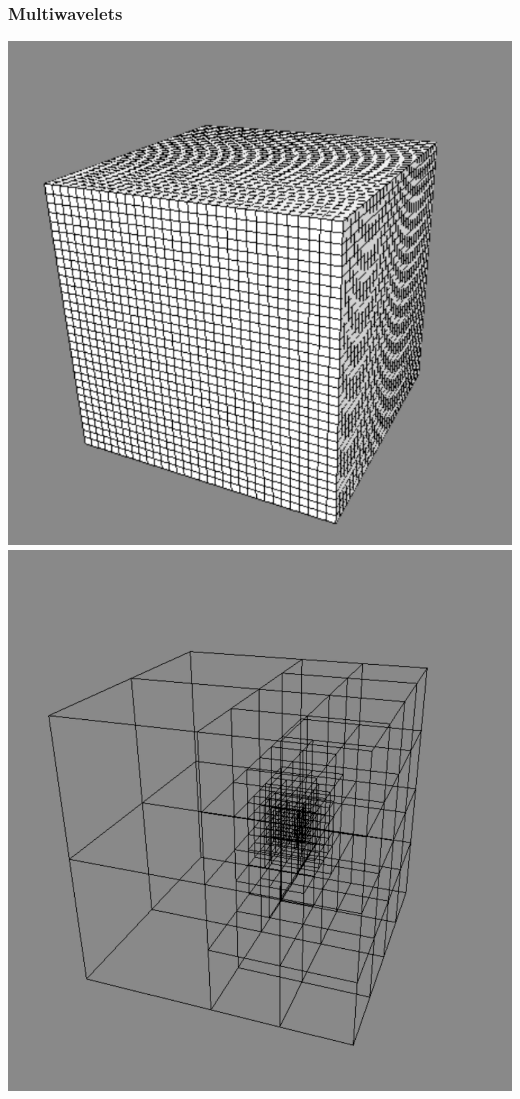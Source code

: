 \begin{frame}
    \frametitle{Multiwavelets}
    \centering
    \includegraphics[scale=0.3]{figures/unifgrid.pdf}
    \includegraphics[scale=0.1788]{figures/adapgrid.pdf}
\end{frame}

